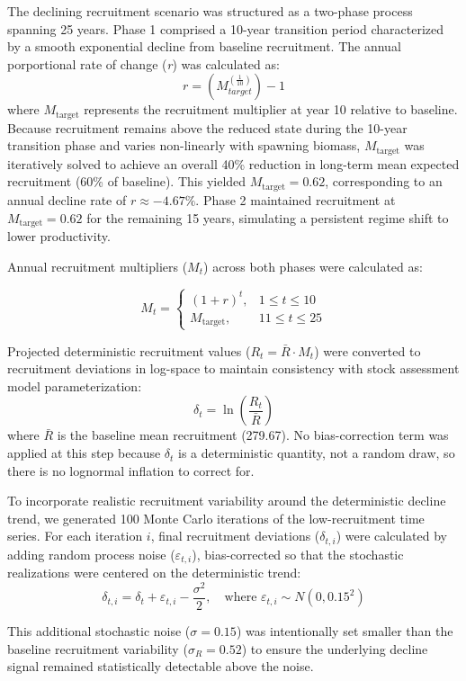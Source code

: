 \documentclass[
  letterpaper,
  12pt,
  letterpaper]{report}
\begin{document}
The declining recruitment scenario was structured as a two-phase process
spanning 25 years. Phase 1 comprised a 10-year transition period
characterized by a smooth exponential decline from baseline recruitment.
The annual porportional rate of change (\emph{r}) was calculated as: \[
r = (M_{target}^(\frac{1}{10})) - 1
\] where \(M_{\text{target}}\) represents the recruitment multiplier at
year 10 relative to baseline. Because recruitment remains above the
reduced state during the 10-year transition phase and varies
non-linearly with spawning biomass, \(M_{\text{target}}\) was
iteratively solved to achieve an overall 40\% reduction in long-term
mean expected recruitment (60\% of baseline). This yielded
\(M_{\text{target}} = 0.62\), corresponding to an annual decline rate of
\(r\approx-4.67\%\). Phase 2 maintained recruitment at
\(M_{\text{target}} = 0.62\) for the remaining 15 years, simulating a
persistent regime shift to lower productivity.

Annual recruitment multipliers (\(M_t\)) across both phases were
calculated as:

\[
M_t = \begin{cases} (1 + r)^t, & 1 \le t \le 10 \\ M_{\text{target}}, & 11 \le t \le 25 \end{cases}
\]

Projected deterministic recruitment values (\(R_t = \bar{R} \cdot M_t\))
were converted to recruitment deviations in log-space to maintain
consistency with stock assessment model parameterization: \[
\delta_t = \ln\left(\frac{R_t}{\bar{R}}\right)
\] where \(\bar{R}\) is the baseline mean recruitment (279.67). No
bias-correction term was applied at this step because \(\delta_t\) is a
deterministic quantity, not a random draw, so there is no lognormal
inflation to correct for.

To incorporate realistic recruitment variability around the
deterministic decline trend, we generated 100 Monte Carlo iterations of
the low-recruitment time series. For each iteration \(i\), final
recruitment deviations (\(\delta_{t,i}\)) were calculated by adding
random process noise (\(\varepsilon_{t,i}\)), bias-corrected so that the
stochastic realizations were centered on the deterministic trend: \[
\delta_{t,i} = \delta_t + \varepsilon_{t,i} - \frac{\sigma^2}{2}, \quad \text{where } \varepsilon_{t,i} \sim N(0, 0.15^2)
\]

This additional stochastic noise (\(\sigma = 0.15\)) was intentionally
set smaller than the baseline recruitment variability
(\(\sigma_R = 0.52\)) to ensure the underlying decline signal remained
statistically detectable above the noise.
\end{document}
